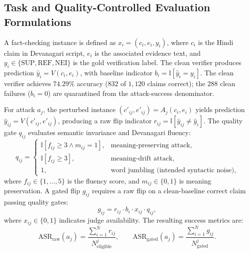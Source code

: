
\subsection{Task and Quality-Controlled Evaluation Formulations}

A fact-checking instance is defined as $x_i = (c_i, e_i, y_i)$, where $c_i$ is the Hindi claim in Devanagari script, $e_i$ is the associated evidence text, and $y_i \in \{\text{SUP}, \text{REF}, \text{NEI}\}$ is the gold verification label. The clean verifier produces prediction $\hat{y}_i = V(c_i, e_i)$, with baseline indicator $b_i = \mathbb{I}[\hat{y}_i = y_i]$. The clean verifier achieves $74.29\%$ accuracy ($832$ of $1,120$ claims correct); the $288$ clean failures ($b_i = 0$) are quarantined from the attack-success denominator.

For attack $a_j$, the perturbed instance $(c'_{ij}, e'_{ij}) = A_j(c_i, e_i)$ yields prediction $\hat{y}_{ij} = V(c'_{ij}, e'_{ij})$, producing a raw flip indicator $r_{ij} = \mathbb{I}[\hat{y}_{ij} \neq \hat{y}_i]$. The quality gate $q_{ij}$ evaluates semantic invariance and Devanagari fluency:
\begin{equation}
q_{ij} = \begin{cases} 
\mathbb{I}[f_{ij} \ge 3 \land m_{ij} = 1], & \text{meaning-preserving attack}, \\ 
\mathbb{I}[f_{ij} \ge 3], & \text{meaning-drift attack}, \\ 
1, & \text{word jumbling (intended syntactic noise)}, 
\end{cases}
\end{equation}
where $f_{ij} \in \{1, \dots, 5\}$ is the fluency score, and $m_{ij} \in \{0, 1\}$ is meaning preservation. A gated flip $g_{ij}$ requires a raw flip on a clean-baseline correct claim passing quality gates:
\begin{equation}
g_{ij} = r_{ij} \cdot b_i \cdot x_{ij} \cdot q_{ij},
\end{equation}
where $x_{ij} \in \{0, 1\}$ indicates judge availability. The resulting success metrics are:
\begin{equation}
\text{ASR}_{\text{raw}}(a_j) = \frac{\sum_{i=1}^{N} r_{ij}}{N_{\text{eligible}}^j}, \qquad \text{ASR}_{\text{gated}}(a_j) = \frac{\sum_{i=1}^{N} g_{ij}}{N_{\text{gated}}^j}.
\end{equation}

